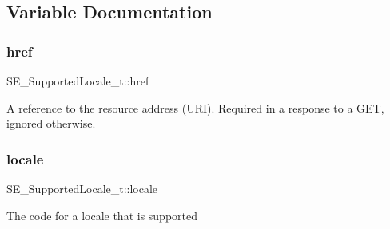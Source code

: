 \subsection{Variable Documentation}
\mbox{\label{group__SupportedLocale_ga4dceab07e3e7dc69ca2393ffea2dc145}} 
\subsubsection{\texorpdfstring{href}{href}}
{\footnotesize\ttfamily S\+E\+\_\+\+Supported\+Locale\+\_\+t\+::href}

A reference to the resource address (U\+RI). Required in a response to a G\+ET, ignored otherwise. \mbox{\label{group__SupportedLocale_ga1fc9258fccc19fa907b3d8cd28b26465}} 
\subsubsection{\texorpdfstring{locale}{locale}}
{\footnotesize\ttfamily S\+E\+\_\+\+Supported\+Locale\+\_\+t\+::locale}

The code for a locale that is supported 
